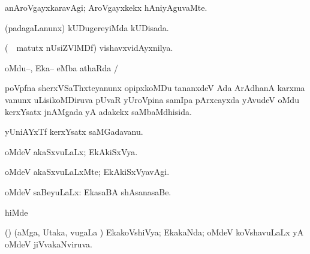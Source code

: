 {\bentry
{} 
\gl{\kirxvi}
\expl{}
\bmng
anAroVgayxkaravAgi; AroVgayxkekx hAniyAguvaMte. 
\emng
\eentry

\bentry
{} 
\gl{\gu}
\expl{}
\bmng
(padagaLanunx) kUDugereyiMda kUDisada. 
\emng
\eentry

\bentry
{} 
\gl{\nA}
\bmng
(\kanmu\ \AseTxrXV\ matutx nUsiZVlMDf) vishavxvidAyxnilya. 
\emng
\eentry

\bentry
{} 
\gl{\sapUpa}
\expl{}
\bmng
oMdu--, Eka-- eMba athaRda \sapUpa/ 
\emng
\eentry

\bentry
{} 
\gl{\gu}
\expl{}
\bmng
poVpfna sherxVSaThxteyanunx opipxkoMDu tananxdeV Ada ArAdhanA karxma \mo vanunx uLisikoMDiruva pUvaR yUroVpina samIpa pArxcayxda yAvudeV oMdu kerxYsatx jnAMgada yA adakekx saMbaMdhisida. 
\emng
\eentry

\bentry
{} 
\gl{\nA}
\expl{}
\bmng
yUniAYxTf kerxYsatx saMGadavanu. 
\emng
\eentry

\bentry
{} 
\gl{\gu}
\expl{}
\bmng
{} 
\emng
\eentry

\bentry
{} 
\gl{\nA}
\expl{}
\bmng
{} 
\emng
\eentry

\bentry
{} 
\gl{\gu}
\expl{}
\bmng
oMdeV akaSxvuLaLx; EkAkiSxVya. 
\emng
\eentry

\bentry
{} 
\gl{\kirxvi}
\expl{}
\bmng
oMdeV akaSxvuLaLxMte; EkAkiSxVyavAgi. 
\emng
\eentry

\bentry
{} 
\gl{\gu}
\expl{}
\bmng
oMdeV saBeyuLaLx:  EkasaBA shAsanasaBe. 
\emng
\eentry

\bentry
{} 
\gl{\saMkiSx}
\expl{}
\bmng
{}hiMde  
\emng
\eentry

\bentry
{} 
\gl{\gu}
\expl{}
\bmng
(\jiVvi) (aMga, Utaka, \mo vugaLa \vi) EkakoVshiVya; EkakaNda; oMdeV koVshavuLaLx yA oMdeV jiVvakaNviruva. 
\emng
\eentry

\bentry
{} 
\gl{\gu}
\expl{}
\bmng
{} 
\emng
\eentry

}
